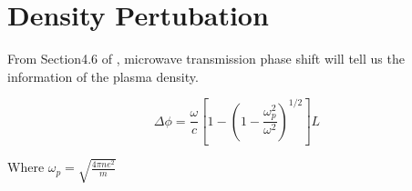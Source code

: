 \section{Density Pertubation}
From Section4.6 of \cite{Principle}, microwave transmission phase shift will tell us the information of the plasma density.

\begin{equation}
    \Delta \phi =\frac{\omega}{c}[1-(1-\frac{\omega_p^2}{\omega^2})^{1/2}]L
\end{equation}

Where $\omega_p=\sqrt{\frac{4\pi ne^2}{m}}$